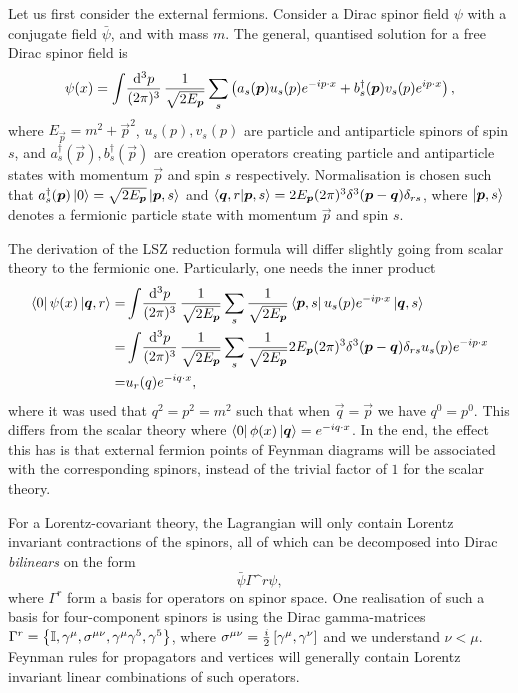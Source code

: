 \documentclass[../main.tex]{subfiles}
\begin{document}
Let us first consider the external fermions.
Consider a Dirac spinor field \(\psi\) with a conjugate field \(\bar\psi\), and with mass \(m\). The general, quantised solution for a free Dirac spinor field is~\cite{Peskin}
\begin{equation}
  \psi(x) = \loopintegral[3]{p} \frac{1}{\sqrt{2E_{\vec{p}}}} \sum_s \pclosed{a_s(\vec{p}) u_s(p) \exp{-i p\cdot x} + b_s^\dagger(\vec{p}) v_s(p) \exp{i p\cdot x}},
\end{equation}
where \(E_{\vec{p}} = m^2 + \vec{p}^2\), \(u_s(p), v_s(p)\) are particle and antiparticle spinors of spin \(s\), and \(a_s^\dagger(\vec{p}), b_s^\dagger(\vec{p})\) are creation operators creating particle and antiparticle states with momentum \(\vec{p}\) and spin \(s\) respectively.
Normalisation is chosen such that \(a_s^\dagger(\vec{p}) \ket{0} = \sqrt{2E_{\vec{p}}} \ket{\vec{p}, s}\) and \(\braket{\vec{q}, r}{\vec{p}, s} = 2E_{\vec{p}} (2\pi)^3 \delta^3(\vec{p}-\vec{q}) \delta_{rs}\), where \(\ket{\vec{p}, s}\) denotes a fermionic particle state with momentum \(\vec{p}\) and spin \(s\).

The derivation of the LSZ reduction formula will differ slightly going from scalar theory to the fermionic one.
Particularly, one needs the inner product
\begin{align}
  \nonumber
  \bra{0}\psi(x)\ket{\vec{q},r} = & \loopintegral[3]{p} \frac{1}{\sqrt{2E_{\vec{p}}}} \sum_s \frac{1}{\sqrt{2E_{\vec{p}}}} \bra{\vec{p}, s}  u_s(p) \exp{-i p\cdot x} \ket{\vec{q}, s}                          \\
  \nonumber
  =                               & \loopintegral[3]{p} \frac{1}{\sqrt{2E_{\vec{p}}}} \sum_s \frac{1}{\sqrt{2E_{\vec{p}}}} 2E_{\vec{p}} (2\pi)^3 \delta^3(\vec{p}-\vec{q}) \delta_{rs} u_s(p) \exp{-i p\cdot x} \\
  =                               & u_r(q) \exp{-i q\cdot x},
\end{align}
where it was used that \(q^2 = p^2 = m^2\) such that when \(\vec{q} = \vec{p}\) we have \(q^0 = p^0\).
This differs from the scalar theory where \(\bra{0} \phi(x) \ket{\vec{q}} = \exp{-i q\cdot x}\).
In the end, the effect this has is that external fermion points of Feynman diagrams will be associated with the corresponding spinors, instead of the trivial factor of \(1\) for the scalar theory.
\medskip

For a Lorentz-covariant theory, the Lagrangian will only contain Lorentz invariant contractions of the spinors, all of which can be decomposed into Dirac \emph{bilinears} on the form
\begin{equation}
  \bar\psi \Gamma\^r \psi,
\end{equation}
where \(\Gamma^r\) form a basis for operators on spinor space.
One realisation of such a basis for four-component spinors is using the Dirac gamma-matrices \(\Gamma\^r = \cclosed{\eye, \gamma\^\mu, \sigma\^{\mu\nu}, \gamma\^\mu \gamma\^5, \gamma\^5}\), where \(\sigma\^{\mu\nu} = \frac{i}{2} \bclosed{\gamma\^\mu, \gamma\^\nu}\) and we understand \(\nu < \mu\).
Feynman rules for propagators and vertices will generally contain Lorentz invariant linear combinations of such operators.
\end{document}
